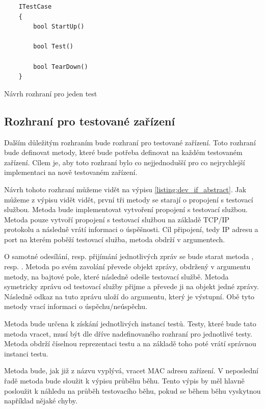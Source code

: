\begin{listing}[htbp]
    \begin{verbatim}
    ITestCase 
    {
        bool StartUp()

        bool Test()

        bool TearDown()
    }
    \end{verbatim}
\caption{Návrh rozhraní pro jeden test}
\label{listing:test_if}
\end{listing}



\subsection{Rozhraní pro testované zařízení}

Dalším důležitým rozhraním bude rozhraní pro testované zařízení. Toto rozhraní bude definovat metody, které bude potřeba definovat na každém testovaném zařízení. Cílem je, aby toto rozhraní bylo co nejjednodušší pro co nejrychlejší implementaci na nově testovaném zařízení.

Návrh tohoto rozhraní můžeme vidět na výpisu \ref{listing:dev_if_abstract}. Jak můžeme z výpisu vidět vidět, první tři metody se starají o propojení s testovací službou. Metoda  bude implementovat vytvoření propojení s testovací službou. Metoda pouze vytvoří propojení s testovací službou na základě TCP/IP protokolu a následně vrátí informaci o úspěšnosti. Cíl připojení, tedy IP adresu a port na kterém poběží testovací služba, metoda obdrží v argumentech.

O samotné odesílání, resp. přijímání jednotlivých zpráv se bude starat metoda , resp. . Metoda  po svém zavolání převede objekt zprávy, obdržený v argumentu metody, na bajtové pole, které následně odešle testovací službě. Metoda  symetricky zprávu od testovací služby přijme a převede ji na objekt jedné zprávy. Následně odkaz na tuto zprávu uloží do argumentu, který je výstupní. Obě tyto metody vrací informaci o úspěchu/neúspěchu.

Metoda  bude určena k získání jednotlivých instancí testů. Testy, které bude tato metoda vracet, musí být dle dříve nadefinovaného rozhraní pro jednotlivé testy. Metoda obdrží číselnou reprezentaci testu a na základě toho poté vrátí správnou instanci testu. 

Metoda  bude, jak již z názvu vyplývá, vracet MAC adresu zařízení. V neposlední řadě metoda  bude sloužit k výpisu průběhu běhu. Tento výpis by měl hlavně posloužit k náhledu na průběh testovacího běhu, pokud se během běhu vyskytnou například nějaké chyby.

